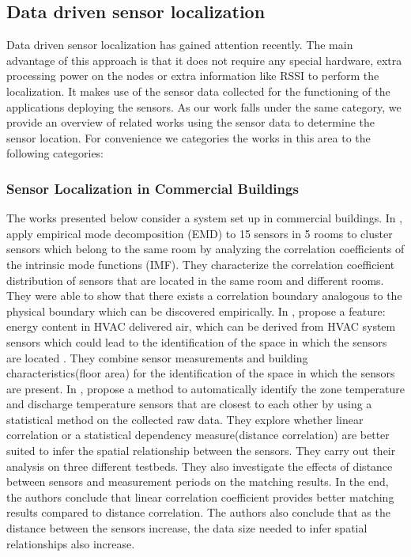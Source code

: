 \subsection{Data driven sensor localization}

Data driven sensor localization has gained attention recently. The main advantage of this approach is that it does not require any special hardware, extra processing power on the nodes or extra information like RSSI to perform the localization.
It makes use of the sensor data collected for the functioning of the applications deploying the sensors. 
As our work falls under the same category, we provide an overview of related works using the sensor data to determine the sensor location. For convenience we categories the works in this area to the following categories:
\subsubsection*{Sensor Localization in Commercial Buildings}
The works presented below consider a system set up in commercial buildings.
 In \cite{Hong:2013:TAS:2528282.2528302}, \citeauthor{Hong:2013:TAS:2528282.2528302} 
 apply empirical mode decomposition (EMD) to 15 sensors in 5 rooms to cluster sensors which belong to the same room by analyzing the correlation coefficients of the intrinsic mode functions (IMF). They characterize the correlation coefficient distribution of sensors that are located in the
 same room and different rooms. They were able to show that there exists a correlation boundary analogous to the physical boundary which can be discovered empirically. 
In \cite{doi:10.1061/9780784413616.226}, \citeauthor{doi:10.1061/9780784413616.226} propose a feature: energy content in HVAC delivered air, which can be derived from HVAC system sensors which could lead to the identification of the space in which the sensors are located . They combine sensor measurements and building characteristics(floor area) for the identification of the space in which the sensors are present.
In \cite{Koc:2014:CLC:2674061.2674075}, \citeauthor{Koc:2014:CLC:2674061.2674075} propose a method to automatically identify the zone temperature and discharge temperature sensors that are closest to each other by using a statistical method on the collected raw data. They explore whether linear correlation or a statistical dependency measure(distance correlation) are better suited to infer the spatial relationship between the sensors. They carry out their analysis on three different testbeds. They also investigate the effects of distance between sensors and measurement periods on the matching results. In the end, the authors conclude that linear correlation coefficient provides better matching results compared to distance correlation. The authors also conclude that as the distance between the sensors increase, the data size needed to infer spatial relationships also increase.
